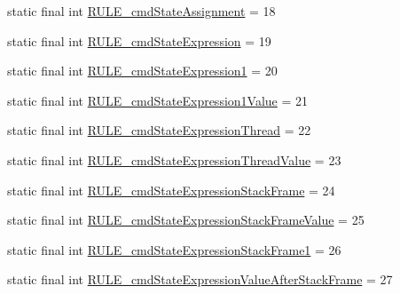 \begin{DoxyCompactItemize}
\item 
static final int \hyperlink{classgov_1_1nasa_1_1jpf_1_1inspector_1_1server_1_1expression_1_1parser_1_1_expression_grammar_parser_a723ef4bbf69d5778d6c3ed45d5a3420f}{R\+U\+L\+E\+\_\+cmd\+State\+Assignment} = 18
\item 
static final int \hyperlink{classgov_1_1nasa_1_1jpf_1_1inspector_1_1server_1_1expression_1_1parser_1_1_expression_grammar_parser_a8e50b121a9eea406631bfc5b78718e9d}{R\+U\+L\+E\+\_\+cmd\+State\+Expression} = 19
\item 
static final int \hyperlink{classgov_1_1nasa_1_1jpf_1_1inspector_1_1server_1_1expression_1_1parser_1_1_expression_grammar_parser_a0ab8b5ce09497a01d54b3aaec758e731}{R\+U\+L\+E\+\_\+cmd\+State\+Expression1} = 20
\item 
static final int \hyperlink{classgov_1_1nasa_1_1jpf_1_1inspector_1_1server_1_1expression_1_1parser_1_1_expression_grammar_parser_a7100ed6eb39d0cfd51a22748670ba354}{R\+U\+L\+E\+\_\+cmd\+State\+Expression1\+Value} = 21
\item 
static final int \hyperlink{classgov_1_1nasa_1_1jpf_1_1inspector_1_1server_1_1expression_1_1parser_1_1_expression_grammar_parser_a4589c66d48feae3e07cf4105251bf56c}{R\+U\+L\+E\+\_\+cmd\+State\+Expression\+Thread} = 22
\item 
static final int \hyperlink{classgov_1_1nasa_1_1jpf_1_1inspector_1_1server_1_1expression_1_1parser_1_1_expression_grammar_parser_ad476f9809eb94bb05fde40ac0a4e5170}{R\+U\+L\+E\+\_\+cmd\+State\+Expression\+Thread\+Value} = 23
\item 
static final int \hyperlink{classgov_1_1nasa_1_1jpf_1_1inspector_1_1server_1_1expression_1_1parser_1_1_expression_grammar_parser_a40e51ee51afcc9b28f5017f19afedc7d}{R\+U\+L\+E\+\_\+cmd\+State\+Expression\+Stack\+Frame} = 24
\item 
static final int \hyperlink{classgov_1_1nasa_1_1jpf_1_1inspector_1_1server_1_1expression_1_1parser_1_1_expression_grammar_parser_a1b97eb47a8038eb03fd05d6d11ad228d}{R\+U\+L\+E\+\_\+cmd\+State\+Expression\+Stack\+Frame\+Value} = 25
\item 
static final int \hyperlink{classgov_1_1nasa_1_1jpf_1_1inspector_1_1server_1_1expression_1_1parser_1_1_expression_grammar_parser_a36207a7edb5ce0a44295fb39c0ab6bde}{R\+U\+L\+E\+\_\+cmd\+State\+Expression\+Stack\+Frame1} = 26
\item 
static final int \hyperlink{classgov_1_1nasa_1_1jpf_1_1inspector_1_1server_1_1expression_1_1parser_1_1_expression_grammar_parser_ae1e433d6d6100c23286a2f0e913b264c}{R\+U\+L\+E\+\_\+cmd\+State\+Expression\+Value\+After\+Stack\+Frame} = 27

\end{DoxyCompactItemize}
